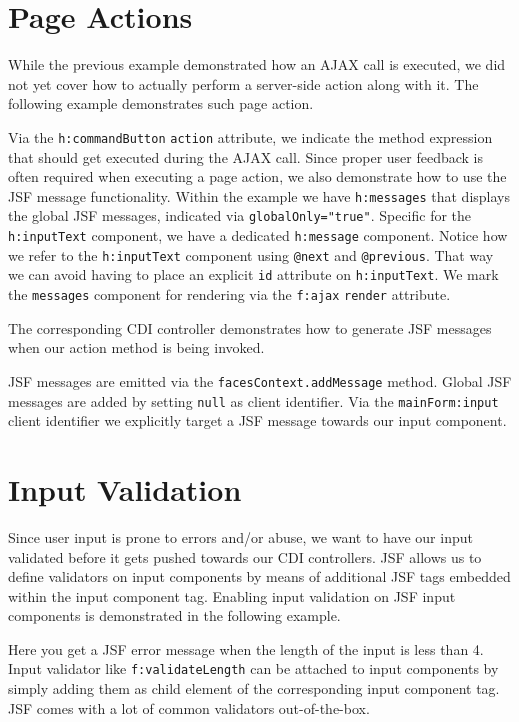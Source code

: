 \section{Page Actions}
While the previous example demonstrated how an AJAX call is executed, we did not yet cover how to actually perform a server-side action along with it.
The following example demonstrates such page action.

Via the \texttt{h:commandButton} \texttt{action} attribute, we indicate the method expression that should get executed during the AJAX call.
Since proper user feedback is often required when executing a page action, we also demonstrate how to use the JSF message functionality.
Within the example we have \texttt{h:messages} that displays the global JSF messages,
indicated via \texttt{globalOnly="true"}.
Specific for the \texttt{h:inputText} component, we have a dedicated \texttt{h:message} component.
Notice how we refer to the \texttt{h:inputText} component using \texttt{@next} and \texttt{@previous}.
That way we can avoid having to place an explicit \texttt{id} attribute on \texttt{h:inputText}.
We mark the \texttt{messages} component for rendering via the \texttt{f:ajax} \texttt{render} attribute.

The corresponding CDI controller demonstrates how to generate JSF messages when our action method is being invoked.

JSF messages are emitted via the \texttt{facesContext.addMessage} method.
Global JSF messages are added by setting \texttt{null} as client identifier.
Via the \texttt{mainForm:input} client identifier we explicitly target a JSF message towards our input component.

\section{Input Validation}
Since user input is prone to errors and/or abuse, we want to have our input validated before it gets pushed towards our CDI controllers.
JSF allows us to define validators on input components by means of additional JSF tags embedded within the input component tag.
Enabling input validation on JSF input components is demonstrated in the following example.

Here you get a JSF error message when the length of the input is less than 4.
Input validator like \texttt{f:validateLength} can be attached to input components by simply adding them as child element of the corresponding input component tag.
JSF comes with a lot of common validators out-of-the-box.

